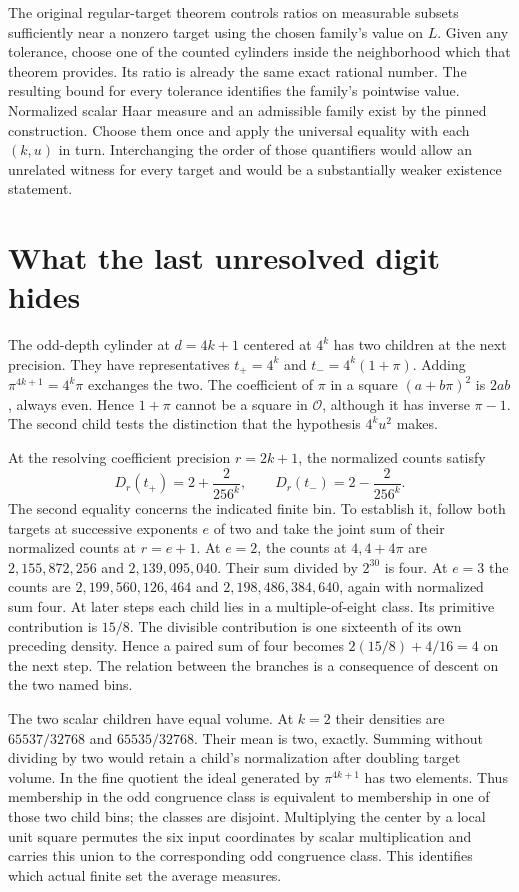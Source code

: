 \documentclass[12pt,letterpaper]{article}
\begin{document}
The original regular-target theorem controls ratios on measurable subsets sufficiently near a nonzero target using the chosen family's value on $L$. Given any tolerance, choose one of the counted cylinders inside the neighborhood which that theorem provides. Its ratio is already the same exact rational number. The resulting bound for every tolerance identifies the family's pointwise value. Normalized scalar Haar measure and an admissible family exist by the pinned construction. Choose them once and apply the universal equality with each $(k,u)$ in turn. Interchanging the order of those quantifiers would allow an unrelated witness for every target and would be a substantially weaker existence statement.

\section{What the last unresolved digit hides}
The odd-depth cylinder at $d=4k+1$ centered at $4^k$ has two children at the next precision. They have representatives $t_+=4^k$ and $t_-=4^k(1+\pi)$. Adding $\pi^{4k+1}=4^k\pi$ exchanges the two. The coefficient of $\pi$ in a square $(a+b\pi)^2$ is $2ab$, always even. Hence $1+\pi$ cannot be a square in $\mathcal O$, although it has inverse $\pi-1$. The second child tests the distinction that the hypothesis $4^ku^2$ makes.

At the resolving coefficient precision $r=2k+1$, the normalized counts satisfy
\[
 D_r(t_+)=2+\frac2{256^k},\qquad D_r(t_-)=2-\frac2{256^k}.
\]
The second equality concerns the indicated finite bin. To establish it, follow both targets at successive exponents $e$ of two and take the joint sum of their normalized counts at $r=e+1$. At $e=2$, the counts at $4,4+4\pi$ are $2{,}155{,}872{,}256$ and $2{,}139{,}095{,}040$. Their sum divided by $2^{30}$ is four. At $e=3$ the counts are $2{,}199{,}560{,}126{,}464$ and $2{,}198{,}486{,}384{,}640$, again with normalized sum four. At later steps each child lies in a multiple-of-eight class. Its primitive contribution is $15/8$. The divisible contribution is one sixteenth of its own preceding density. Hence a paired sum of four becomes $2(15/8)+4/16=4$ on the next step. The relation between the branches is a consequence of descent on the two named bins.

The two scalar children have equal volume. At $k=2$ their densities are $65537/32768$ and $65535/32768$. Their mean is two, exactly. Summing without dividing by two would retain a child's normalization after doubling target volume. In the fine quotient the ideal generated by $\pi^{4k+1}$ has two elements. Thus membership in the odd congruence class is equivalent to membership in one of those two child bins; the classes are disjoint. Multiplying the center by a local unit square permutes the six input coordinates by scalar multiplication and carries this union to the corresponding odd congruence class. This identifies which actual finite set the average measures.
\end{document}
